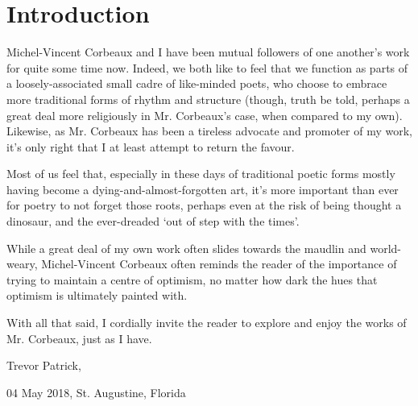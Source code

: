 \chapter*{Introduction}

Michel-Vincent Corbeaux and I have been mutual followers of one another’s work for quite some time now. Indeed, we both like to feel that we function as parts of a loosely-associated small cadre of like-minded poets, who choose to embrace more traditional forms of rhythm and structure (though, truth be told, perhaps a great deal more religiously in Mr. Corbeaux's case, when compared to my own). Likewise, as Mr. Corbeaux has been a tireless advocate and promoter of my work, it’s only right that I at least attempt to return the favour.


Most of us feel that, especially in these days of traditional poetic forms mostly having become a dying-and-almost-forgotten art, it’s more important than ever for poetry to not forget those roots, perhaps even at the risk of being thought a dinosaur, and the ever-dreaded ‘out of step with the times’.


While a great deal of my own work often slides towards the maudlin and world-weary, Michel-Vincent Corbeaux often reminds the reader of the importance of trying to maintain a centre of optimism, no matter how dark the hues that optimism is ultimately painted with.


With all that said, I cordially invite the reader to explore and enjoy the works of Mr. Corbeaux, just as I have.

\vspace{1em}

Trevor Patrick,

04 May 2018, St. Augustine, Florida
